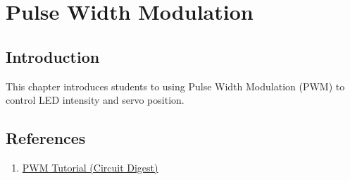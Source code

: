 \chapter{Pulse Width Modulation}

\section{Introduction}
This chapter introduces students to using Pulse Width Modulation (PWM) to control LED intensity
and servo position.


\section{References}
\begin{enumerate}
	\item \href{https://circuitdigest.com/tutorial/what-is-pwm-pulse-width-modulation}{PWM Tutorial (Circuit Digest)}
\end{enumerate}
